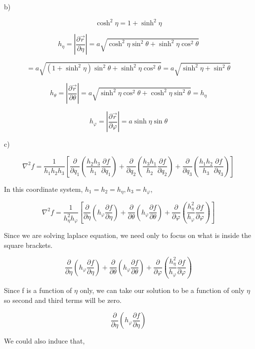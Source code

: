 \documentclass[12pt]{article}
\begin{document}
b)

\[
    \cosh^2 \eta = 1 + \sinh^2 \eta
\]

\[
    h_\eta = \left\lvert \frac{\partial \vec{r}}{\partial \eta}\right\rvert
    = a \sqrt{\cosh^2 \eta \sin^2 \theta + \sinh^2 \eta \cos^2 \theta}
\]

\[
    = a \sqrt{(1 + \sinh^2 \eta) \sin^2 \theta + \sinh^2 \eta \cos^2 \theta}
    = a \sqrt{\sinh^2 \eta + \sin^2 \theta}
\]

\[
    h_\theta = \left\lvert \frac{\partial \vec{r}}{\partial \theta}\right\rvert
    = a \sqrt{\sinh^2 \eta \cos^2 \theta + \cosh^2 \eta \sin^2 \theta} = h_\eta
\]

\[
    h_\varphi = \left\lvert \frac{\partial \vec{r}}{\partial \varphi}\right\rvert
    = a \sinh \eta \sin \theta
\]

c)

\[
    \nabla^2 f = \frac{1}{h_1 h_2 h_3}\left[\frac{\partial}{\partial q_1}\left(\frac{h_2 h_3}{h_1} \frac{\partial f}{\partial q_1}\right)+\frac{\partial}{\partial q_2}\left(\frac{h_3 h_1}{h_2} \frac{\partial f}{\partial q_2}\right)+\frac{\partial}{\partial q_3}\left(\frac{h_1 h_2}{h_3} \frac{\partial f}{\partial q_3}\right)\right]
\]

In this coordinate system, \(h_1 = h_2 = h_\eta, h_3 = h_\varphi \),

\[
    \nabla^2 f = \frac{1}{h_\eta^2 h_\varphi}\left[\frac{\partial}{\partial \eta}\left(h_\varphi \frac{\partial f}{\partial \eta}\right)+\frac{\partial}{\partial \theta}\left(h_\varphi \frac{\partial f}{\partial \theta}\right)+\frac{\partial}{\partial \varphi}\left(\frac{h_\eta^2}{h_\varphi} \frac{\partial f}{\partial \varphi}\right)\right]
\]

Since we are solving laplace equation, we need only to focus on what is inside the square brackets.

\[
    \frac{\partial}{\partial \eta}\left(h_\varphi \frac{\partial f}{\partial \eta}\right)
    + \frac{\partial}{\partial \theta}\left(h_\varphi \frac{\partial f}{\partial \theta}\right)
    + \frac{\partial}{\partial \varphi}\left(\frac{h_\eta^2}{h_\varphi} \frac{\partial f}{\partial \varphi}\right)
\]

Since f is a function of \(\eta \) only, we can take our solution to be a function of only \(\eta \) so second and third terms will be zero.

\[
    \frac{\partial}{\partial \eta}\left(h_\varphi \frac{\partial f}{\partial \eta}\right)
\]

We could also induce that,
\end{document}
